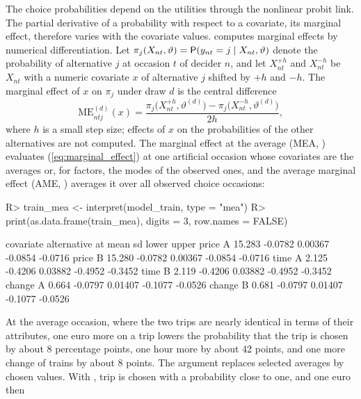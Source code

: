 \documentclass[article,shortnames]{jss}
\newcommand{\fct}[1]{\code{#1()}}
\begin{document}
The choice probabilities depend on the utilities through the nonlinear probit
link. The partial derivative of a probability with respect to a covariate, its
marginal effect, therefore varies with the covariate values. \fct{interpret}
computes marginal effects by numerical differentiation. Let $\pi_j(X_{nt},
\vartheta) = \mathsf{P}(y_{nt} = j \mid X_{nt}, \vartheta)$ denote the probability of
alternative $j$ at occasion $t$ of decider $n$, and let $X_{nt}^{+h}$ and
$X_{nt}^{-h}$ be $X_{nt}$ with a numeric covariate $x$ of alternative $j$
shifted by $+h$ and $-h$. The marginal effect of $x$ on $\pi_j$ under draw $d$
is the central difference
%
\begin{equation}
\label{eq:marginal_effect}
\mathrm{ME}_{ntj}^{(d)}(x) = \frac{\pi_j\big(X_{nt}^{+h}, \vartheta^{(d)}\big) -
\pi_j\big(X_{nt}^{-h}, \vartheta^{(d)}\big)}{2h},
\end{equation}
%
where $h$ is a small step size; effects of $x$ on the probabilities of the other
alternatives are not computed. The marginal effect at the average (MEA,
) evaluates (\ref{eq:marginal_effect}) at one artificial
occasion whose covariates are the averages or, for factors, the modes of the
observed ones, and the average marginal effect (AME, )
averages it over all observed choice occasions:
%
\begin{Schunk}
\begin{Sinput}
R> train_mea <- interpret(model_train, type = "mea")
R> print(as.data.frame(train_mea), digits = 3, row.names = FALSE)
\end{Sinput}
\begin{Soutput}
 covariate alternative     at    mean      sd   lower   upper
     price           A 15.283 -0.0782 0.00367 -0.0854 -0.0716
     price           B 15.280 -0.0782 0.00367 -0.0854 -0.0716
      time           A  2.125 -0.4206 0.03882 -0.4952 -0.3452
      time           B  2.119 -0.4206 0.03882 -0.4952 -0.3452
    change           A  0.664 -0.0797 0.01407 -0.1077 -0.0526
    change           B  0.681 -0.0797 0.01407 -0.1077 -0.0526
\end{Soutput}
\end{Schunk}
%
At the average occasion, where the two trips are nearly identical in terms of
their attributes, one euro more on a trip lowers the probability that the trip
is chosen by about 8 percentage points, one hour more by about 42 points, and
one more change of trains by about 8 points. The argument  replaces
selected averages by chosen values. With , trip  is chosen with a probability close to one, and one euro then
\end{document}
